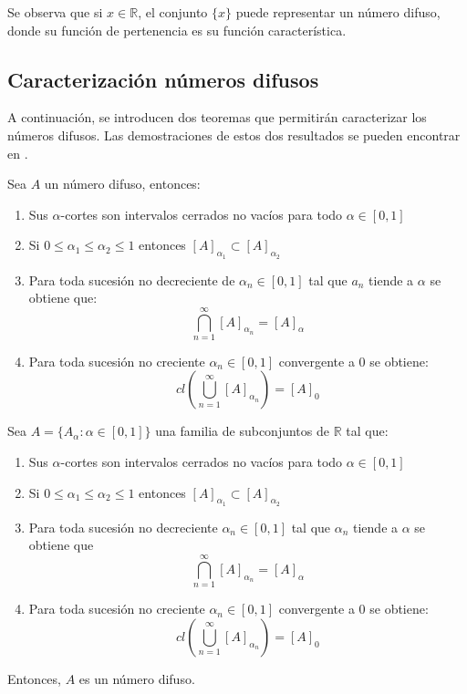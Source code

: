   Se observa que si $x \in \mathbb{R}$, el conjunto $\{x\}$ puede representar un número difuso, donde su función de pertenencia es su función característica.


  \subsection{Caracterización números difusos}
  A continuación, se introducen dos teoremas que permitirán caracterizar los números difusos. Las demostraciones de estos dos resultados se pueden encontrar en \cite{fuzzyintro}.

  \begin{teorema}
    Sea $A$ un número difuso, entonces:
    \begin{enumerate}
    \item Sus $\alpha$-cortes son intervalos cerrados no vacíos para todo $\alpha \in [0, 1]$
    \item Si $0 \leq \alpha_1 \leq \alpha_2 \leq 1$ entonces $[A]_{\alpha_1} \subset [A]_{\alpha_2}$
    \item Para toda sucesión no decreciente de $\alpha_n \in [0, 1]$ tal que $a_n$ tiende a $\alpha$ se obtiene que:
      \[
      \bigcap^\infty_{n=1} [A]_{\alpha_n} = [A]_\alpha
      \]
    \item Para toda sucesión no creciente $\alpha_n \in [0, 1]$ convergente a $0$ se obtiene:
      \[
      cl\left(
      \bigcup^\infty_{n=1} [A]_{\alpha_n} \right) = [A]_0
      \]
    \end{enumerate}
  \end{teorema}

  \begin{teorema}
    Sea $A=\{A_\alpha : \alpha \in [0, 1]\}$ una familia de subconjuntos de $\mathbb{R}$ tal que:
    
    \begin{enumerate}
    \item Sus $\alpha$-cortes son intervalos cerrados no vacíos para todo $\alpha \in [0, 1]$
    \item Si $0 \leq \alpha_1 \leq \alpha_2 \leq 1$ entonces $[A]_{\alpha_1} \subset [A]_{\alpha_2}$
    \item Para toda sucesión no decreciente $\alpha_n \in [0, 1]$ tal que $\alpha_n$ tiende a $\alpha$ se obtiene que
      $$
      \bigcap^\infty_{n=1} [A]_{\alpha_n}=[A]_\alpha
      $$
    \item Para toda sucesión no creciente $\alpha_n \in [0, 1]$ convergente a $0$ se obtiene:
      $$
      cl\left(\bigcup^\infty_{n=1} [A]_{\alpha_n}\right)=[A]_0
      $$
    \end{enumerate}
    Entonces, $A$ es un número difuso.
  \end{teorema}


